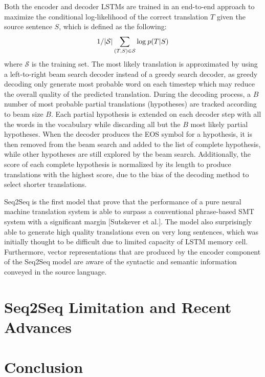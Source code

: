 \documentclass[12pt]{extarticle}
\begin{document}
Both the encoder and decoder LSTMs are trained in an end-to-end approach to maximize the conditional log-likelihood of the correct translation $T$ given the source sentence $S$, which is defined as the following:
\begin{align}
1/ |\mathcal{S}| \sum_{(T,S) \in \mathcal{S}} \textnormal{log}\: p(T|S)
\end{align}
where $\mathcal{S}$ is the training set. The most likely translation is approximated by using a left-to-right beam search decoder instead of a greedy search decoder, as greedy decoding only generate most probable word on each timestep which may reduce the overall quality of the predicted translation. During the decoding process, a $B$ number of most probable partial translations (hypotheses) are tracked according to beam size $B$. Each partial hypothesis is extended on each decoder step with all the words in the vocabulary while discarding all but the $B$ most likely partial hypotheses. When the decoder produces the EOS symbol for a hypothesis, it is then removed from the beam search and added to the list of complete hypothesis, while other hypotheses are still explored by the beam search. Additionally, the score of each complete hypothesis is normalized by its length to produce translations with the highest score, due to the bias of the decoding method to select shorter translations.

Seq2Seq is the first model that prove that the performance of a pure neural machine translation system is able to surpass a conventional phrase-based SMT system with a significant margin [Sutskever et al.]. The model also surprisingly able to generate high quality translations even on very long sentences, which was initially thought to be difficult due to limited capacity of LSTM memory cell. Furthermore, vector representations that are produced by the encoder component of the Seq2Seq model are aware of the syntactic and semantic information conveyed in the source language.  


\section*{Seq2Seq Limitation and Recent Advances} %


\section*{Conclusion}
\end{document}
